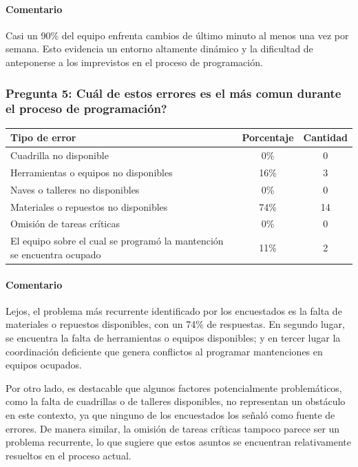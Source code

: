 \documentclass{article}
\begin{document}
\begin{appendix}
    \paragraph{Comentario} Casi un 90\% del equipo enfrenta cambios de último minuto al menos una vez por semana. Esto evidencia un entorno altamente dinámico y la dificultad de anteponerse a los imprevistos en el proceso de programación.
    
    
    \vspace{1.5em}
    \subsubsection*{Pregunta 5: Cuál de estos errores es el más comun durante el proceso de programación?}
    
    \begin{table}[htbp]
        \centering
        \begin{tabular}{p{7cm}cc}
            \toprule
            \textbf{Tipo de error} & \textbf{Porcentaje} & \textbf{Cantidad} \\
            \midrule
            Cuadrilla no disponible & 0\% & 0 \\
            Herramientas o equipos no disponibles & 16\% & 3 \\
            Naves o talleres no disponibles & 0\% & 0 \\
            Materiales o repuestos no disponibles & 74\% & 14 \\
            Omisión de tareas críticas & 0\% & 0 \\
            El equipo sobre el cual se programó la mantención se encuentra ocupado & 11\% & 2 \\
            \bottomrule
        \end{tabular}
        \label{tab:errores_comunes}
    \end{table}
    
    \paragraph{Comentario} Lejos, el problema más recurrente identificado por los encuestados es la falta de materiales o repuestos disponibles, con un 74\% de respuestas. En segundo lugar, se encuentra la falta de herramientas o equipos disponibles; y en tercer lugar la coordinación deficiente que genera conflictos al programar mantenciones en equipos ocupados.
    
    Por otro lado, es destacable que algunos factores potencialmente problemáticos, como la falta de cuadrillas o de talleres disponibles, no representan un obstáculo en este contexto, ya que ninguno de los encuestados los señaló como fuente de errores. De manera similar, la omisión de tareas críticas tampoco parece ser un problema recurrente, lo que sugiere que estos asuntos se encuentran relativamente resueltos en el proceso actual.
    

\end{appendix}
\end{document}
